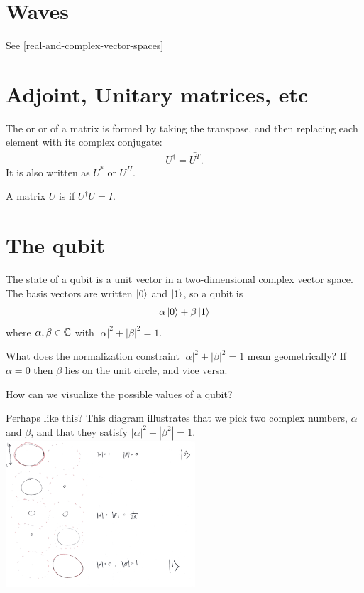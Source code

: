 \section{Waves}

\newpage
See \ref{real-and-complex-vector-spaces}
\section{Adjoint, Unitary matrices, etc}\label{adjoint-and-unitary-matrices}
The  or  or  of a matrix is formed
by taking the transpose, and then replacing each element with its complex conjugate:
\begin{align*}
  U^\dag = \bar{U^T}.
\end{align*}
It is also written as $U^*$ or $U^H$.

A matrix $U$ is  if $U^\dag U = I$.

\newpage
\section{The qubit}

The state of a qubit is a unit vector in a two-dimensional complex vector space. The basis vectors
are written $\ket{0}$ and $\ket{1}$, so a qubit is
\begin{align*}
  \alpha\ket{0} + \beta\ket{1}
\end{align*}
where $\alpha, \beta \in \mathbb{C}$ with $|\alpha|^2 + |\beta|^2 = 1$.

What does the normalization constraint $|\alpha|^2 + |\beta|^2 = 1$ mean geometrically? If
$\alpha = 0$ then $\beta$ lies on the unit circle, and vice versa.

How can we visualize the possible values of a qubit?

Perhaps like this? This diagram illustrates that we pick two complex numbers, $\alpha$ and $\beta$,
and that they satisfy $|\alpha|^2 + |\beta^2| = 1$.\\
\includegraphics[width=200pt]{img/quantum-qubit-2.png}

